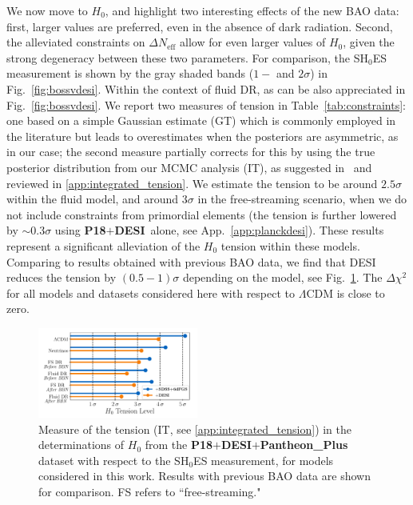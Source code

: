 \documentclass[aps,prd,twocolumn,notitlepage,
superscriptaddress,
nofootinbib,floatfix]{revtex4-2}
\newcommand{\planck}{\textbf{P18}}
\newcommand{\desi}{$\mathbf{+}$\textbf{DESI}}
\newcommand{\pantheon}{$\mathbf{+}${\bf Pantheon\_Plus}}
\begin{document}
We now move to $H_0$, and highlight two interesting effects of the new BAO data: first, larger values are preferred, even in the absence of dark radiation. Second, the alleviated constraints on $\Delta N_\text{eff}$ allow for even larger values of $H_0$, given the strong degeneracy between these two parameters. For comparison, the SH$_0$ES measurement is shown by the gray shaded bands ($1-$ and $2\sigma$) in Fig.~\ref{fig:bossvdesi}. Within the context of fluid DR, as can be also appreciated in Fig.~\ref{fig:bossvdesi}. We report two measures of tension in Table~\ref{tab:constraints}: one based on a simple Gaussian estimate (GT) which is commonly employed in the literature but leads to overestimates when the posteriors are asymmetric, as in our case; the second measure partially corrects for this by using the true posterior distribution from our MCMC analysis (IT), as suggested in~\cite{Raveri:2021wfz} and reviewed in \cref{app:integrated_tension}. We estimate the tension to be around $2.5\sigma$ within the fluid model, and around $3\sigma$ in the free-streaming scenario, when we do not include constraints from primordial elements (the tension is further lowered by $\sim 0.3\sigma$ using \planck\desi~alone, see App.~\ref{app:planckdesi}). These results represent a significant alleviation of the $H_0$ tension within these models. Comparing to results obtained with previous BAO data, we find that DESI reduces the tension by $(0.5-1)\sigma$ depending on the model, see Fig.~\ref{fig:lollipop}. The $\Delta\chi^2$ for all models and datasets considered here with respect to $\Lambda$CDM is close to zero.




\begin{figure}[t]
    \includegraphics[width=0.47\textwidth]{figures_21_4/H0tension_lollipop_noH0.pdf}
    \caption{Measure of the tension (IT, see \cref{app:integrated_tension}) in the determinations of $H_0$ from the \planck\desi\pantheon \,  dataset with respect to the SH$_0$ES measurement, for models considered in this work. Results with previous BAO data are shown for comparison. FS refers to ``free-streaming."}
    \label{fig:lollipop}
\end{figure}
\end{document}
